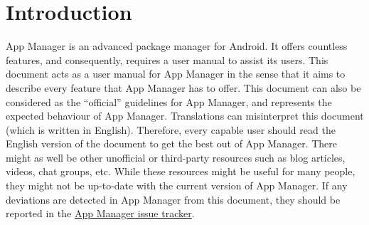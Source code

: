 \chapter{Introduction}\label{ch:introduction} %
App Manager is an advanced package manager for Android. It offers countless features, and consequently, requires a user
manual to assist its users. This document acts as a user manual for App Manager in the sense that it aims to describe
every feature that App Manager has to offer. This document can also be considered as the ``official'' guidelines for
App Manager, and represents the expected behaviour of App Manager. Translations can misinterpret this document (which is
written in English). Therefore, every capable user should read the English version of the document to get the best out
of App Manager. There might as well be other unofficial or third-party resources such as blog articles, videos, chat
groups, etc. While these resources might be useful for many people, they might not be up-to-date with the current
version of App Manager. If any deviations are detected in App Manager from this document, they should be reported in the
\href{https://github.com/MuntashirAkon/AppManager/issues}{App Manager issue tracker}.


